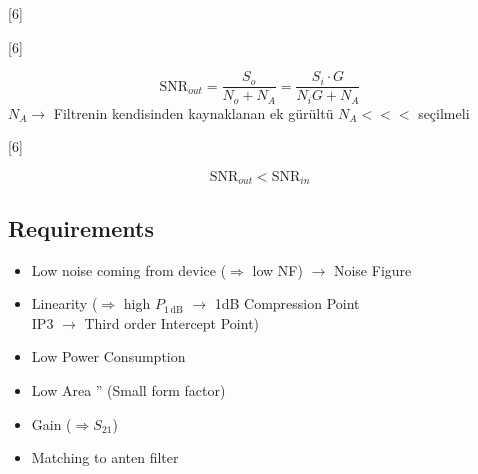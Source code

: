 \documentclass[11pt,a4paper]{article}
\begin{document}
[6]

[6]

\[ \mathrm{SNR}_{out} = \dfrac{S_o}{N_o + N_A} = \dfrac{S_i \cdot G}{N_i G + N_A} \]
$N_A \to$ Filtrenin kendisinden kaynaklanan ek gürültü \qquad $N_A <<<$ seçilmeli

[6]

\[ \mathrm{SNR}_{out} < \mathrm{SNR}_{in} \]

\subsection*{Requirements}
\begin{itemize}
  \item[--] Low noise coming from device ($\Rightarrow$ low NF) $\rightarrow$ Noise Figure
  \item[--] Linearity ($\Rightarrow$ high $P_{1\,\mathrm{dB}}$ $\rightarrow$ 1dB Compression Point \\
        IP3 $\rightarrow$ Third order Intercept Point)
  \item[--] Low Power Consumption
  \item[--] Low Area '' (Small form factor)
  \item[--] Gain ($\Rightarrow S_{21}$)
  \item[--] Matching to anten filter
\end{itemize}
\end{document}
